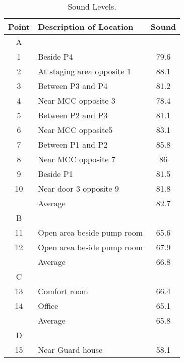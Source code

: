 \begin{table}
	\caption{Sound Levels.}
	\label{ch047_tbl_sound}
	{\footnotesize

\begin{tabular}{c|l|c}

\hline
Point & Description of Location & Sound \\ 
\hline
A &  &  \\ 
1 & Beside P4 & 79.6 \\ 
2 & At staging area opposite 1 & 88.1 \\ 
3 & Between P3 and P4 & 81.2 \\ 
4 & Near MCC opposite 3 & 78.4 \\ 
5 & Between P2 and P3 & 81.1 \\ 
6 & Near MCC opposite5 & 83.1 \\ 
7 & Between P1 and P2 & 85.8 \\ 
8 & Near MCC opposite 7 & 86 \\ 
9 & Beside P1 & 81.5 \\ 
10 & Near door 3 opposite 9 & 81.8 \\ 
 & Average & 82.7 \\ 
\hline
B &  &  \\ 
11 & Open area beside pump room & 65.6 \\ 
12 & Open area beside pump room & 67.9 \\ 
 & Average & 66.8 \\ 
\hline
C &  &  \\ 
13 & Comfort room & 66.4 \\ 
14 & Office & 65.1 \\ 
 & Average & 65.8 \\ 
\hline
D &  &  \\ 
15 & Near Guard house & 58.1 \\ 
\hline

\end{tabular}
}
\end{table}